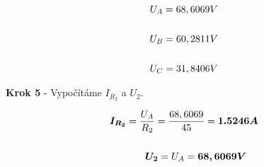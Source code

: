 \vspace{0.5cm}

\begin{gather*}
U_A = 68,6069 V \\\\
\newline
\newline
U_B = 60,2811 V \\\\
\newline
\newline
U_C = 31,8406 V
\end{gather*}

\vspace{1cm}

\begin{center}
\textbf{Krok 5} - Vypočítáme $I_{R_2}$ a $U_2$. \\
\end{center}

\begin{gather*}
\boldsymbol{I_{R_2}} = \frac{U_A}{R_2} = \frac{68,6069}{45} = \boldsymbol{1.5246 A} \\\\
\newline
\newline
\boldsymbol{U_2} = U_A = \boldsymbol{68,6069 V}
\end{gather*}